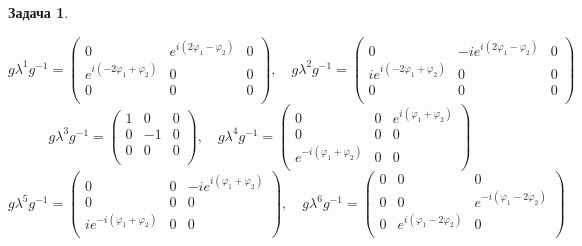 \documentclass[12pt]{article}
\theoremstyle{definition}
\newtheorem{zad}{Задача}[section]
\begin{document}
\begin{zad}
\begin{itemize}
\begin{equation*}
    g\lambda^1g^{-1}=\left(
    \begin{array}{ccc}
        0 & e^{i(2\varphi_1-\varphi_2)} & 0\\
        e^{i(-2\varphi_1+\varphi_2)} & 0 & 0\\
        0 & 0 & 0\\
    \end{array}
    \right),\quad g\lambda^2g^{-1}=\left(
    \begin{array}{ccc}
        0 & -ie^{i(2\varphi_1-\varphi_2)} & 0\\
        ie^{i(-2\varphi_1+\varphi_2)} & 0 & 0\\
        0 & 0 & 0\\
    \end{array}
    \right)
    \end{equation*}
    \begin{equation*}
    g\lambda^3g^{-1}=\left(
    \begin{array}{ccc}
        1 & 0 & 0\\
        0 & -1 & 0\\
        0 & 0 & 0\\
    \end{array}
    \right),\quad g\lambda^4g^{-1}=\left(
    \begin{array}{ccc}
        0 & 0 & e^{i(\varphi_1+\varphi_2)}\\
        0 & 0 & 0\\
        e^{-i(\varphi_1+\varphi_2)} & 0 & 0\\
    \end{array}
    \right)
    \end{equation*}
    \begin{equation*}
    g\lambda^5g^{-1}=\left(
    \begin{array}{ccc}
        0 & 0 & -ie^{i(\varphi_1+\varphi_2)}\\
        0 & 0 & 0\\
        ie^{-i(\varphi_1+\varphi_2)} & 0 & 0\\
    \end{array}
    \right),\quad g\lambda^6g^{-1}=\left(
    \begin{array}{ccc}
        0 & 0 & 0\\
        0 & 0 & e^{-i(\varphi_1-2\varphi_2)}\\
        0 & e^{i(\varphi_1-2\varphi_2)} & 0\\
    \end{array}
    \right)
    \end{equation*}

\end{itemize}
\end{zad}
\end{document}
